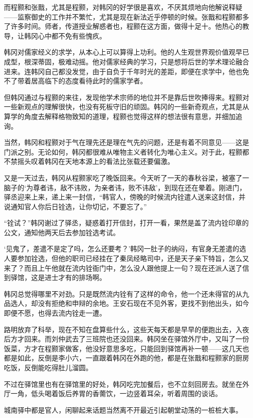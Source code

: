 而程颢和张戬，尤其是程颢，对韩冈的好学很是喜欢，不厌其烦地向他解说释疑——监察御史的工作并不繁忙，尤其是现在新法近乎停顿的时候。张戬和程颢都多了许多时间。师者，传道授业解惑者也，程颢在这方面，做得十足十。他热心的教导，让韩冈心中都不免有些愧疚。

韩冈对儒家经义的求学，从本心上可以算得上功利。他的人生观世界观价值观早已成型，根深蒂固，极难动摇。他对儒家经典的学习，只是想将后世的学术理论融合进来。连韩冈自己都没发觉，由于自负于千年时光的差距，即便在求学中，他也免不了带着居高临下的态度看待此时的儒家学者。

但韩冈通过与程颢的来往，发现他学术宗师的地位并不是靠后世吹捧得来。程颢对一些新观点的理解很快，也没有死板守旧的顽固。韩冈的一些新奇观点，尤其是从算学的角度去解释格物致知的道理，程颢也觉得这样的想法很有意思，并细加追询。

当然，韩冈和程颢对于气在理先还是理在气先的问题，还是有着不同意见——这是门派之别。无论如何，韩冈都很难从唯物主义者转化为唯心主义。对于此，程颢都不禁摇头叹着韩冈在天地本源上的看法比张载还要偏激。

又是一天过去，韩冈从程颢家吃了晚饭回来。今天听了一天的春秋谷梁，被塞了一脑子的‘为尊者讳，敌不讳败，为亲者讳，败不讳敌’，到现在还在晕着。刚进门，驿丞迎来上来，递上来一封信，“韩官人，傍晚的时候流内铨遣人送来这封信，并说通知官人你后日铨选，让你切记，不要忘了。”

“铨试？”韩冈谢过了驿丞，疑惑着打开信封，打开一看，果然是盖了流内铨印章的公文，通知他两天后去参加铨选考试。

‘见鬼了，差遣不是定了吗，怎么还要考？’韩冈一肚子的纳闷，有官身无差遣的选人要参加铨选，但他的职司已经挂在了秦凤经略司中，还是天子亲下特旨，怎么又来了？而且上午他就在流内铨衙门中，怎么没人跟他提上一句？现在还派人送了信到驿馆，这是进士才有的排场啊。

韩冈总觉得哪里不对劲。只是既然流内铨有了这样的命令，他一个还未得官的从九品选人，却没有拒绝和申辩的余地。王安石现在不见外客，更找不到他出头，如今即便不愿，也得去流内铨走一遭。

路明放弃了科举，现在不知在盘算些什么，这些天每天都是早早的便跑出去，入夜后方才回来。而刘仲武去了三班院也还没回来。韩冈坐在驿馆外厅中，又叫了一份饭菜，方才在程颢家做客，他没好意思多吃，只能回到驿馆再补一顿——这几天也都是如此，反倒是李小六，一直跟着韩冈在外跑的他，都是在张戬和程颢家的厨房吃饭，反倒能吃得肚儿溜圆。

不过在驿馆里也有在驿馆里的好处，韩冈吃完加餐后，也不立刻回房去。就坐在外厅一角，低头喝着饭后养胃的香薷饮，一边竖着耳朵，听着周围的谈话。

城南驿中都是官人，闲聊起来话题当然离不开最近引起朝堂动荡的一桩桩大事。

